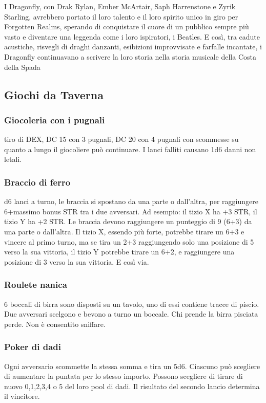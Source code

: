 \documentclass{article}
\begin{document}
I Dragonfly, con Drak Rylan, Ember McArtair, Saph Harrenstone e Zyrik Starling, avrebbero portato il loro talento e il loro spirito unico in giro per Forgotten Realms, sperando di conquistare il cuore di un pubblico sempre più vasto e diventare una leggenda come i loro ispiratori, i Beatles. E così, tra cadute acustiche, risvegli di draghi danzanti, esibizioni improvvisate e farfalle incantate, i Dragonfly continuavano a scrivere la loro storia nella storia musicale della Costa della Spada







\subsection{Giochi da Taverna}
\subsubsection{Giocoleria con i pugnali} tiro di DEX, DC 15 con 3 pugnali, DC 20 con 4 pugnali con scommesse su quanto a lungo il giocoliere può continuare. I lanci falliti causano 1d6 danni non letali.
\subsubsection{Braccio di ferro} d6 lanci a turno, le braccia si spostano da una parte o dall'altra, per raggiungere 6+massimo bonus STR tra i due avversari. Ad esempio: il tizio X ha +3 STR, il tizio Y ha +2 STR. Le braccia devono raggiungere un punteggio di 9 (6+3) da una parte o dall'altra. Il tizio X, essendo più forte, potrebbe tirare un 6+3 e vincere al primo turno, ma se tira un 2+3 raggiungendo solo una posizione di 5 verso la sua vittoria, il tizio Y potrebbe tirare un 6+2, e raggiungere una posizione di 3 verso la sua vittoria. E così via.
\subsubsection{Roulete nanica}6 boccali di birra sono disposti su un tavolo, uno di essi contiene tracce di piscio. Due avversari scelgono e bevono a turno un boccale. Chi prende la birra pisciata perde. Non è consentito sniffare.
\subsubsection{Poker di dadi}Ogni avversario scommette la stessa somma e tira un 5d6. Ciascuno può scegliere di aumentare la puntata per lo stesso importo. Possono scegliere di tirare di nuovo 0,1,2,3,4 o 5 del loro pool di dadi. Il risultato del secondo lancio determina il vincitore.
\end{document}
